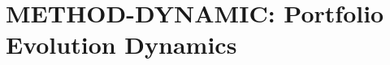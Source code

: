 %
%

\appendix

\chapter{METHOD-DYNAMIC: Portfolio Evolution Dynamics}
\label{app:kkk-method-dynamic}

\begin{abstract}
This appendix provides formal mathematical foundations for dynamic portfolio evolution
within the Evidence-Based Framework. It presents ODEs, Markov chains, Bayesian parameter
learning, and convergence analysis for understanding how intervention portfolios evolve
over time as behavioral states change.
\end{abstract}


